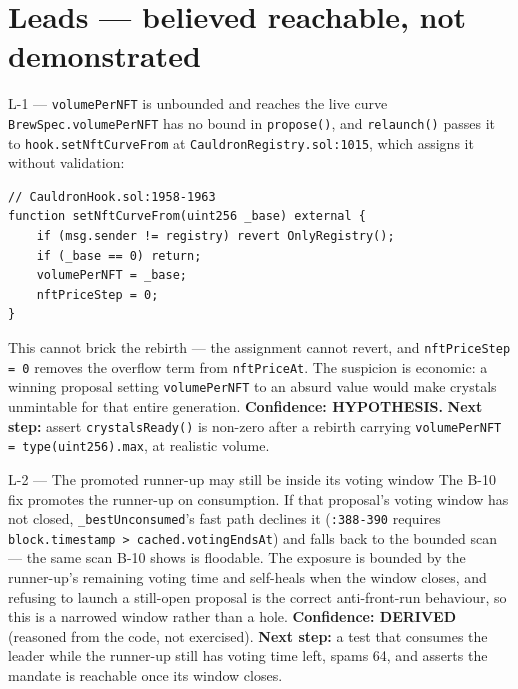 \documentclass[11pt,a4paper]{article}
\newcommand{\code}[1]{\texttt{\small #1}}
\newcommand{\fileref}[1]{\texttt{\scriptsize #1}}
\begin{document}
\section{Leads --- believed reachable, not demonstrated}

\begin{notebox}{L-1 --- \code{volumePerNFT} is unbounded and reaches the live curve}
\code{BrewSpec.volumePerNFT} has no bound in \code{propose()}, and \code{relaunch()} passes
it to \code{hook.setNftCurveFrom} at \fileref{CauldronRegistry.sol:1015}, which assigns it
without validation:
\begin{lstlisting}
// CauldronHook.sol:1958-1963
function setNftCurveFrom(uint256 _base) external {
    if (msg.sender != registry) revert OnlyRegistry();
    if (_base == 0) return;
    volumePerNFT = _base;
    nftPriceStep = 0;
}
\end{lstlisting}
This cannot brick the rebirth --- the assignment cannot revert, and \code{nftPriceStep = 0}
removes the overflow term from \code{nftPriceAt}. The suspicion is economic: a winning
proposal setting \code{volumePerNFT} to an absurd value would make crystals unmintable for
that entire generation. \textbf{Confidence: HYPOTHESIS.} \textbf{Next step:} assert
\code{crystalsReady()} is non-zero after a rebirth carrying
\code{volumePerNFT = type(uint256).max}, at realistic volume.
\end{notebox}

\begin{notebox}{L-2 --- The promoted runner-up may still be inside its voting window}
The B-10 fix promotes the runner-up on consumption. If that proposal's voting window has
not closed, \code{\_bestUnconsumed}'s fast path declines it (\fileref{:388-390} requires
\code{block.timestamp > cached.votingEndsAt}) and falls back to the bounded scan --- the
same scan B-10 shows is floodable. The exposure is bounded by the runner-up's remaining
voting time and self-heals when the window closes, and refusing to launch a still-open
proposal is the correct anti-front-run behaviour, so this is a narrowed window rather than
a hole. \textbf{Confidence: DERIVED} (reasoned from the code, not exercised).
\textbf{Next step:} a test that consumes the leader while the runner-up still has voting
time left, spams 64, and asserts the mandate is reachable once its window closes.
\end{notebox}

\end{document}

